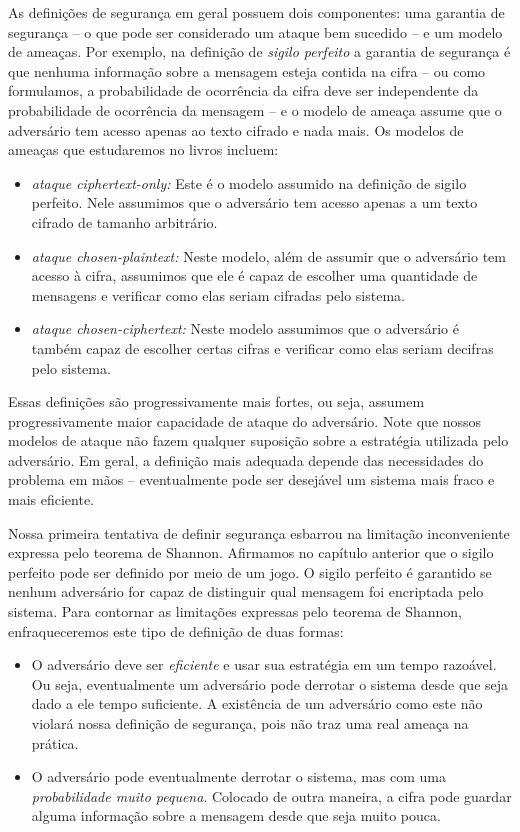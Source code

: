 As definições de segurança em geral possuem dois componentes: uma garantia de segurança -- o que pode ser considerado um ataque bem sucedido -- e um modelo de ameaças.
Por exemplo, na definição de {\em sigilo perfeito} a garantia de segurança é que nenhuma informação sobre a mensagem esteja contida na cifra -- ou como formulamos, a probabilidade de ocorrência da cifra deve ser independente da probabilidade de ocorrência da mensagem -- e o modelo de ameaça assume que o adversário tem acesso apenas ao texto cifrado e nada mais. 
Os modelos de ameaças que estudaremos no livros incluem:
\begin{itemize}
\item {\em ataque ciphertext-only:} Este é o modelo assumido na definição de sigilo perfeito.
Nele assumimos que o adversário tem acesso apenas a um texto cifrado de tamanho arbitrário.
\item {\em ataque chosen-plaintext:} Neste modelo, além de assumir que o adversário tem acesso à cifra, assumimos que ele é capaz de escolher uma quantidade de mensagens e verificar como elas seriam cifradas pelo sistema.
\item {\em ataque chosen-ciphertext:} Neste modelo assumimos que o adversário é também capaz de escolher certas cifras e verificar como elas seriam decifras pelo sistema.
\end{itemize}

Essas definições são progressivamente mais fortes, ou seja, assumem progressivamente maior capacidade de ataque do adversário.
Note que nossos modelos de ataque não fazem qualquer suposição sobre a estratégia utilizada pelo adversário.
Em geral, a definição mais adequada depende das necessidades do problema em mãos -- eventualmente pode ser desejável um sistema mais fraco e mais eficiente.

Nossa primeira tentativa de definir segurança esbarrou na limitação inconveniente expressa pelo teorema de Shannon.
Afirmamos no capítulo anterior que o sigilo perfeito pode ser definido por meio de um jogo.
O sigilo perfeito é garantido se nenhum adversário for capaz de distinguir qual mensagem foi encriptada pelo sistema.
Para contornar as limitações expressas pelo teorema de Shannon, enfraqueceremos este tipo de definição de duas formas:
\begin{itemize}
\item O adversário deve ser {\em eficiente} e usar sua estratégia em um tempo razoável.
  Ou seja, eventualmente um adversário pode derrotar o sistema desde que seja dado a ele tempo suficiente.
  A existência de um adversário como este não violará nossa definição de segurança, pois não traz uma real ameaça na prática.
\item O adversário pode eventualmente derrotar o sistema, mas com uma {\em probabilidade muito pequena}.
Colocado de outra maneira, a cifra pode guardar alguma informação sobre a mensagem desde que seja muito pouca. 
\end{itemize}

